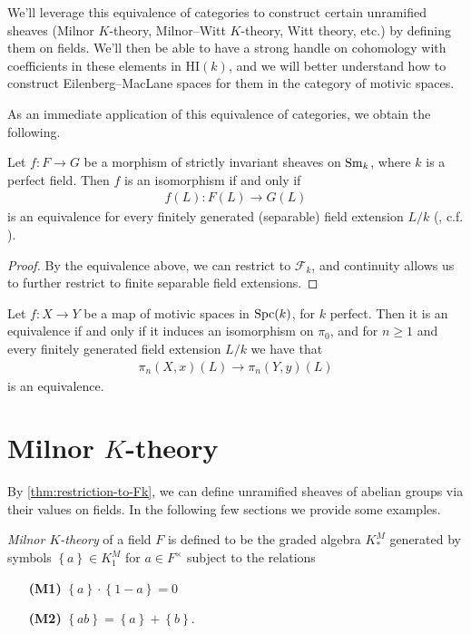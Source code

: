 \documentclass[11pt,openany]{book}
\providecommand{\HI}{\mathrm{HI}}
\begin{document}
\begin{motivation} We'll leverage this equivalence of categories to construct certain unramified sheaves (Milnor $K$-theory, Milnor--Witt $K$-theory, Witt theory, etc.) by defining them on fields. We'll then be able to have a strong handle on cohomology with coefficients in these elements in $\HI(k)$, and we will better understand how to construct Eilenberg--MacLane spaces for them in the category of motivic spaces.
\end{motivation}

As an immediate application of this equivalence of categories, we obtain the following.

\begin{theorem}
Let $f \colon F\to G$ be a morphism of strictly invariant sheaves on $\mathrm{Sm}_k$, where $k$ is a perfect field. Then $f$ is an isomorphism if and only if
\begin{align*}
    f(L) \colon F(L) \to G(L)
\end{align*}
is an equivalence for every finitely generated (separable) field extension $L/k$ (\cite[2.3,~2.8]{Morel}, c.f. \cite[2.7]{HMH}).
\end{theorem}
\begin{proof} By the equivalence above, we can restrict to $\mathcal{F}_k$, and continuity allows us to further restrict to finite separable field extensions.
\end{proof}


\begin{corollary} Let $f \colon X \to Y$ be a map of motivic spaces in $\mathrm{Spc}(k)$, for $k$ perfect. Then it is an equivalence if and only if it induces an isomorphism on $\pi_0$, and for $n\ge 1$ and every finitely generated field extension $L/k$ we have that
\begin{align*}
    \pi_n(X,x)(L) \to \pi_n(Y,y)(L)
\end{align*}
is an equivalence.
\end{corollary}


\section{Milnor \texorpdfstring{$K$}{K}-theory}

By \autoref{thm:restriction-to-Fk}, we can define unramified sheaves of abelian groups via their values on fields. In the following few sections we provide some examples.

\begin{definition} \textit{Milnor $K$-theory} of a field $F$ is defined to be the graded algebra $K_\ast^M$ generated by symbols $\left\{ a \right\}\in K_1^M$ for $a\in F^\times$ subject to the relations
\begin{enumerate}
    \item[\textbf{(M1)}] $\left\{ a \right\}\cdot \left\{ 1-a \right\} = 0$
    \item[\textbf{(M2)}] $\left\{ ab \right\} = \left\{ a \right\} + \left\{ b \right\}$.
\end{enumerate}
\end{definition}
\end{document}

